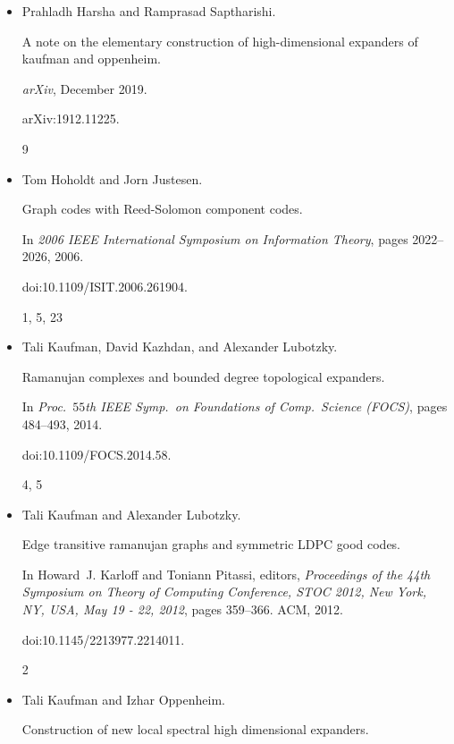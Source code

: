 \begin{itemize}
\item[] 
[15]

Prahladh Harsha and Ramprasad Saptharishi.


A note on the elementary construction of high-dimensional expanders
of kaufman and oppenheim.


\emph{arXiv}, December 2019.


arXiv:1912.11225.


9




\item[] 
[16]

Tom Hoholdt and Jorn Justesen.


Graph codes with Reed-Solomon component codes.


In \emph{2006 IEEE International Symposium on Information Theory},
pages 2022–2026, 2006.


doi:10.1109/ISIT.2006.261904.


1, 5, 23




\item[] 
[17]

Tali Kaufman, David Kazhdan, and Alexander Lubotzky.


Ramanujan complexes and bounded degree topological expanders.


In \emph{Proc. $55$th IEEE Symp. on Foundations of Comp. Science
(FOCS)}, pages 484–493, 2014.


doi:10.1109/FOCS.2014.58.


4, 5




\item[] 
[18]

Tali Kaufman and Alexander Lubotzky.


Edge transitive ramanujan graphs and symmetric LDPC good codes.


In Howard J. Karloff and Toniann Pitassi, editors, \emph{Proceedings
of the 44th Symposium on Theory of Computing Conference, STOC 2012, New
York, NY, USA, May 19 - 22, 2012}, pages 359–366. ACM, 2012.


doi:10.1145/2213977.2214011.


2




\item[] 
[19]

Tali Kaufman and Izhar Oppenheim.


Construction of new local spectral high dimensional expanders.



\end{itemize}
